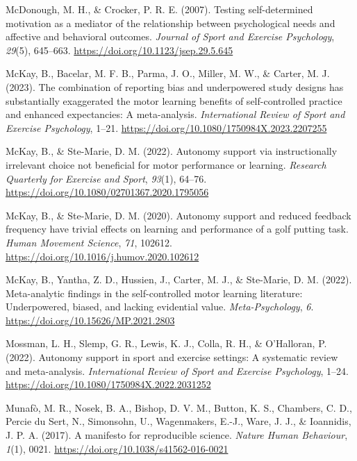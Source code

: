 \documentclass[
  man, donotrepeattitle,mask,floatsintext]{apa7}
\newlength{\cslhangindent}
\newlength{\cslentryspacingunit} %
\newenvironment{CSLReferences}[2] %
 {%
  \setlength{\parindent}{0pt}
  \ifodd #1
  \let\oldpar\par
  \def\par{\hangindent=\cslhangindent\oldpar}
  \fi
  \setlength{\parskip}{#2\cslentryspacingunit}
 }%
 {}
\begin{document}
\begin{CSLReferences}{1}{0}
\leavevmode{}%
McDonough, M. H., \& Crocker, P. R. E. (2007). Testing self-determined motivation as a mediator of the relationship between psychological needs and affective and behavioral outcomes. \emph{Journal of Sport and Exercise Psychology}, \emph{29}(5), 645--663. \url{https://doi.org/10.1123/jsep.29.5.645}

\leavevmode{}%
McKay, B., Bacelar, M. F. B., Parma, J. O., Miller, M. W., \& Carter, M. J. (2023). The combination of reporting bias and underpowered study designs has substantially exaggerated the motor learning benefits of self-controlled practice and enhanced expectancies: A meta-analysis. \emph{International Review of Sport and Exercise Psychology}, 1--21. \url{https://doi.org/10.1080/1750984X.2023.2207255}

\leavevmode{}%
McKay, B., \& Ste-Marie, D. M. (2022). Autonomy support via instructionally irrelevant choice not beneficial for motor performance or learning. \emph{Research Quarterly for Exercise and Sport}, \emph{93}(1), 64--76. \url{https://doi.org/10.1080/02701367.2020.1795056}

\leavevmode{}%
McKay, B., \& Ste-Marie, D. M. (2020). Autonomy support and reduced feedback frequency have trivial effects on learning and performance of a golf putting task. \emph{Human Movement Science}, \emph{71}, 102612. \url{https://doi.org/10.1016/j.humov.2020.102612}

\leavevmode{}%
McKay, B., Yantha, Z. D., Hussien, J., Carter, M. J., \& Ste-Marie, D. M. (2022). Meta-analytic findings in the self-controlled motor learning literature: {Underpowered}, biased, and lacking evidential value. \emph{Meta-Psychology}, \emph{6}. \url{https://doi.org/10.15626/MP.2021.2803}

\leavevmode{}%
Mossman, L. H., Slemp, G. R., Lewis, K. J., Colla, R. H., \& O'Halloran, P. (2022). Autonomy support in sport and exercise settings: {A} systematic review and meta-analysis. \emph{International Review of Sport and Exercise Psychology}, 1--24. \url{https://doi.org/10.1080/1750984X.2022.2031252}

\leavevmode{}%
Munafò, M. R., Nosek, B. A., Bishop, D. V. M., Button, K. S., Chambers, C. D., Percie du Sert, N., Simonsohn, U., Wagenmakers, E.-J., Ware, J. J., \& Ioannidis, J. P. A. (2017). A manifesto for reproducible science. \emph{Nature Human Behaviour}, \emph{1}(1), 0021. \url{https://doi.org/10.1038/s41562-016-0021}


\end{CSLReferences}
\end{document}
